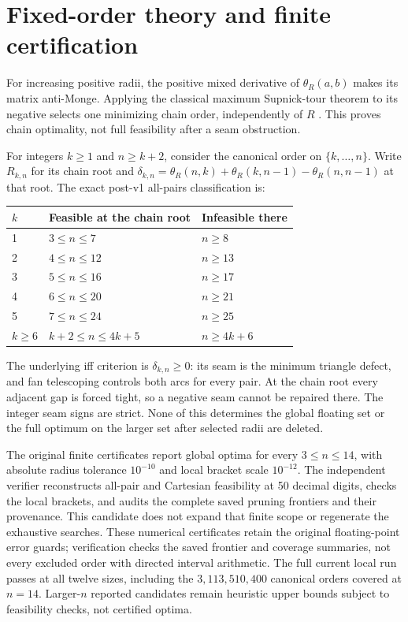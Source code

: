 \documentclass[11pt]{article}
\theoremstyle{definition}\newtheorem{definition}[theorem]{Definition}
\theoremstyle{remark}\newtheorem{remark}[theorem]{Remark}
\begin{document}
\section{Fixed-order theory and finite certification}

For increasing positive radii, the positive mixed derivative of
$\theta_R(a,b)$ makes its matrix anti-Monge. Applying the classical maximum
Supnick-tour theorem to its negative selects one minimizing chain order,
independently of $R$ \cite{supnick,survey}. This proves chain optimality,
not full feasibility after a seam obstruction.

For integers $k\ge1$ and $n\ge k+2$, consider the canonical order on
$\{k,\ldots,n\}$. Write $R_{k,n}$ for its chain
root and
$\delta_{k,n}=\theta_R(n,k)+\theta_R(k,n-1)-\theta_R(n,n-1)$ at that root.
The exact post-v1 all-pairs classification \cite{fixed} is:
\begin{center}\begin{tabular}{lll}\toprule
$k$ & Feasible at the chain root & Infeasible there\\\midrule
1 & $3\le n\le7$ & $n\ge8$\\
2 & $4\le n\le12$ & $n\ge13$\\
3 & $5\le n\le16$ & $n\ge17$\\
4 & $6\le n\le20$ & $n\ge21$\\
5 & $7\le n\le24$ & $n\ge25$\\
$k\ge6$ & $k+2\le n\le4k+5$ & $n\ge4k+6$\\\bottomrule
\end{tabular}\end{center}
The underlying iff criterion is $\delta_{k,n}\ge0$: its seam is the minimum
triangle defect, and fan telescoping controls both arcs for every pair.
At the chain root every adjacent gap is forced tight, so a negative seam
cannot be repaired there. The integer seam signs are strict. None of this
determines the global floating set or the full optimum on the larger set
after selected radii are deleted.

The original finite certificates report global optima for every
$3\le n\le14$, with absolute radius tolerance $10^{-10}$ and local bracket
scale $10^{-12}$. The independent verifier reconstructs all-pair and Cartesian
feasibility at 50 decimal digits, checks the local brackets, and audits the
complete saved pruning frontiers and their provenance. This candidate does
not expand that finite scope or regenerate the exhaustive searches.
These numerical certificates retain the original floating-point error guards;
verification checks the saved frontier and coverage summaries, not every
excluded order with directed interval arithmetic.
The full current local run passes at all twelve sizes, including the
$3{,}113{,}510{,}400$ canonical orders covered at $n=14$.
Larger-$n$ reported candidates remain heuristic upper bounds subject to
feasibility checks, not certified optima.
\end{document}
